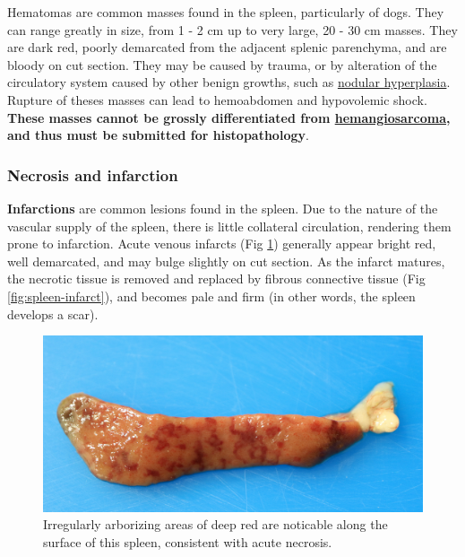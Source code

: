 \documentclass[openany]{article}
\begin{document}
Hematomas are common masses found in the spleen, particularly of dogs.
They can range greatly in size, from 1 - 2 cm up to very large, 20 - 30
cm masses. They are dark red, poorly demarcated from the adjacent
splenic parenchyma, and are bloody on cut section. They may be caused by
trauma, or by alteration of the circulatory system caused by other
benign growths, such as \protect\hyperlink{nodular-hyperplasia}{nodular
hyperplasia}. Rupture of theses masses can lead to hemoabdomen and
hypovolemic shock. \textbf{These masses cannot be grossly differentiated
from \protect\hyperlink{hemangiosarcoma}{hemangiosarcoma}, and thus must
be submitted for histopathology}.

\subsubsection{Necrosis and infarction}\label{necrosis-and-infarction}

\textbf{Infarctions} are common lesions found in the spleen. Due to the
nature of the vascular supply of the spleen, there is little collateral
circulation, rendering them prone to infarction. Acute venous infarcts
(Fig \ref{fig:spleen-infarct-acute}) generally appear bright red, well
demarcated, and may bulge slightly on cut section. As the infarct
matures, the necrotic tissue is removed and replaced by fibrous
connective tissue (Fig \ref{fig:spleen-infarct}), and becomes pale and
firm (in other words, the spleen develops a scar).

\begin{figure}

{\centering \includegraphics[width=1\linewidth]{images/20-18021-canine-spleen-necrosis-2} 

}

\caption{Irregularly arborizing areas of deep red are noticable along the surface of this spleen, consistent with acute necrosis.}\label{fig:spleen-infarct-acute}
\end{figure}
\end{document}
